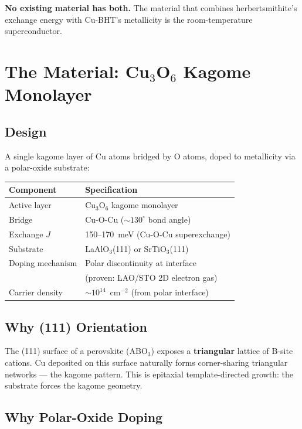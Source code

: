 \documentclass[11pt, a4paper]{article}
\begin{document}
\textbf{No existing material has both.} The material that combines
herbertsmithite's exchange energy with Cu-BHT's metallicity is the
room-temperature superconductor.

\section{The Material: Cu$_3$O$_6$ Kagome Monolayer}

\subsection{Design}

A single kagome layer of Cu atoms bridged by O atoms, doped to
metallicity via a polar-oxide substrate:

\begin{center}
\begin{tabular}{@{}ll@{}}
\toprule
\textbf{Component} & \textbf{Specification} \\
\midrule
Active layer & Cu$_3$O$_6$ kagome monolayer \\
Bridge & Cu-O-Cu ($\sim 130^\circ$ bond angle) \\
Exchange $J$ & 150--170~meV (Cu-O-Cu superexchange) \\
Substrate & LaAlO$_3$(111) or SrTiO$_3$(111) \\
Doping mechanism & Polar discontinuity at interface \\
 & (proven: LAO/STO 2D electron gas) \\
Carrier density & $\sim 10^{14}$~cm$^{-2}$ (from polar interface) \\
\bottomrule
\end{tabular}
\end{center}

\subsection{Why (111) Orientation}

The (111) surface of a perovskite (ABO$_3$) exposes a
\textbf{triangular} lattice of B-site cations. Cu deposited on
this surface naturally forms corner-sharing triangular networks
--- the kagome pattern. This is epitaxial template-directed growth:
the substrate forces the kagome geometry.

\subsection{Why Polar-Oxide Doping}
\end{document}
